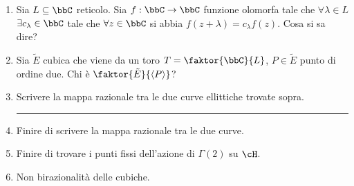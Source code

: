 \begin{enumerate}
\item Sia $L\subseteq \bbC$ reticolo. Sia $f: \bbC \rar \bbC$ funzione olomorfa tale che $\forall \lambda \in L$ $\exists c_{\lambda}\in\bbC$ tale che $\forall z\in\bbC$ si abbia $f(z+\lambda)=c_{\lambda}f(z)$. Cosa si sa dire?
\item Sia $\tilde E$ cubica che viene da un toro $T=\faktor{\bbC}{L}$, $P\in \tilde E$ punto di ordine due. Chi è $\faktor{\tilde E}{\langle P\rangle}$?
\item Scrivere la mappa razionale tra le due curve ellittiche trovate sopra.
\bigskip
\hrule
\bigskip

\item Finire di scrivere la mappa razionale tra le due curve.
\item Finire di trovare i punti fissi dell'azione di $\Gamma(2)$ su $\cH$.
\item Non birazionalità delle cubiche.
\end{enumerate}
\newpage

